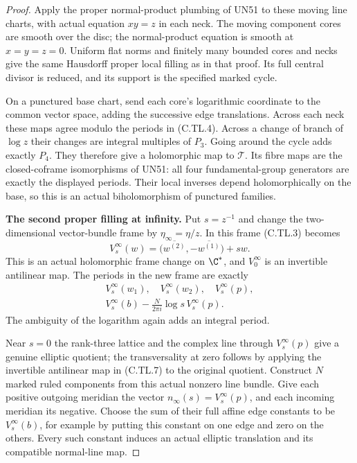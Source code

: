 \begin{proof}
Apply the proper normal-product plumbing of UN51 to these
moving line charts, with actual equation $xy=z$ in each neck.
The moving component cores are smooth over the disc; the
normal-product equation is smooth at $x=y=z=0$.
Uniform flat norms and finitely many bounded cores and necks
give the same Hausdorff proper local filling as in that proof.
Its full central divisor is reduced, and its support is the
specified marked cycle.

On a punctured base chart, send each core's logarithmic
coordinate to the common vector space, adding the successive
edge translations. Across each neck these maps agree modulo
the periods in (C.TL.4). Across a change of branch of $\log z$
their changes are integral multiples of $P_3$. Going around
the cycle adds exactly $P_4$. They therefore give a holomorphic
map to $\mathcal T$. Its fibre maps are the closed-coframe
isomorphisms of UN51: all four fundamental-group generators
are exactly the displayed periods. Their local inverses
depend holomorphically on the base, so this is an actual
biholomorphism of punctured families.

\par\medskip\noindent\textbf{The second proper filling at infinity.}
Put $s=z^{-1}$ and change the two-dimensional vector-bundle
frame by $\eta_\infty=\eta/z$. In this frame (C.TL.3) becomes
\[
 V^\infty_s(w)
       =\bigl(\overline{w^{(2)}},-\overline{w^{(1)}}\bigr)
                          +s w.
 \tag{C.TL.7}
\]
This is an actual holomorphic frame change on $\C^*$, and
$V^\infty_0$ is an invertible antilinear map. The periods
in the new frame are exactly
\[
 \begin{gathered}
 V^\infty_s(w_1),\quad V^\infty_s(w_2),\quad V^\infty_s(p),\\
 V^\infty_s(b)
          -\frac{N}{2\pi i}\log s\,V^\infty_s(p).
 \end{gathered}
 \tag{C.TL.8}
\]
The ambiguity of the logarithm again adds an integral period.

Near $s=0$ the rank-three lattice and the complex line through
$V^\infty_s(p)$ give a genuine elliptic quotient; the
transversality at zero follows by applying the invertible
antilinear map in (C.TL.7) to the original quotient.
Construct $N$ marked ruled components from this actual
nonzero line bundle. Give each positive outgoing meridian
the vector $n_\infty(s)=V^\infty_s(p)$, and each incoming
meridian its negative. Choose the sum of their full affine
edge constants to be $V^\infty_s(b)$, for example by putting
this constant on one edge and zero on the others.
Every such constant induces an actual elliptic translation
and its compatible normal-line map.


\end{proof}
